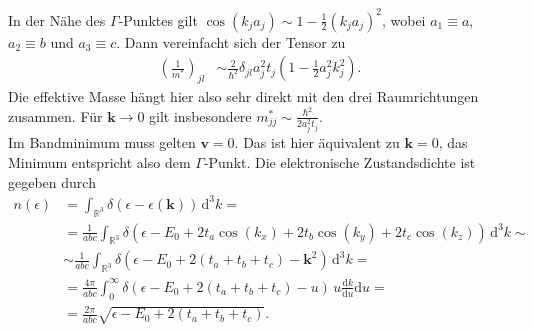\documentclass[english, parskip=full]{scrartcl}
\newcommand{\intx}{}
\newcommand{\intr}{}
\newcommand{\kla}{}
\newcommand{\tecxt}{}
\begin{document}
In der Nähe des $\Gamma$-Punktes gilt $\cos(k_ja_j) \sim 1 - \frac{1}{2} (k_ja_j)^2$, wobei $a_1\equiv a$, $a_2\equiv b$ und $a_3\equiv c$.
Dann vereinfacht sich der Tensor zu
\begin{align}
\kla\left( \frac{1}{m^\ast} \right)_{jl} &\sim \frac{2}{\hbar^2} \delta_{jl} a_j^2t_j\kla\left( 1 - \frac{1}{2}a_j^2k_j^2 \right).
\end{align}
Die effektive Masse hängt hier also sehr direkt mit den drei Raumrichtungen zusammen.
Für $\textbf{k}\rightarrow 0$ gilt insbesondere $m^\ast_{jj} \sim \frac{\hbar^2}{2a_j^2t_j}$.
\\
Im Bandminimum muss gelten $\textbf{v} = 0$.
Das ist hier äquivalent zu $\textbf{k} = 0$, das Minimum entspricht also dem $\Gamma$-Punkt.
Die elektronische Zustandsdichte ist gegeben durch
\begin{align}
n(\epsilon) &= \intr\int_{\mathbb{R}^{3}} \delta\kla\left( \epsilon - \epsilon(\textbf{k}) \right) \, \mathrm{d}^{3}k = \\
&= \frac{1}{abc} \intr\int_{\mathbb{R}^{3}} \delta\kla\left( \epsilon - E_0 + 2t_a\cos(k_x) + 2t_b\cos(k_y) + 2t_c\cos(k_z) \right) \, \mathrm{d}^{3}k \sim\\
&\sim \frac{1}{abc} \intr\int_{\mathbb{R}^{3}} \delta\kla\left( \epsilon - E_0 + 2(t_a+t_b+t_c) - \textbf{k}^2 \right) \, \mathrm{d}^{3}k = \\
&= \frac{4\pi}{abc} \intx\int_{0}^{\infty} \delta\kla\left( \epsilon - E_0 + 2(t_a+t_b+t_c) - u \right) \, u \frac{\tecxt\text{d}k}{\tecxt\text{d}u} \mathrm{d}u = \\
&= \frac{2\pi}{abc} \sqrt{\epsilon - E_0 + 2(t_a+t_b+t_c)}.
\end{align}
\end{document}
